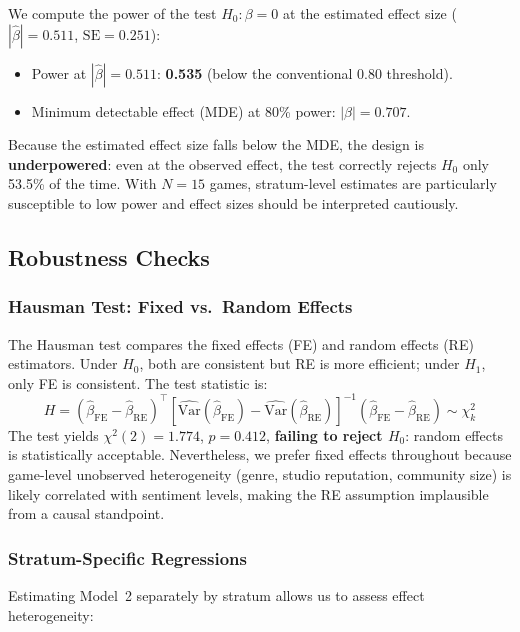 \documentclass[11pt, letterpaper]{article}
\begin{document}
We compute the power of the test $H_0: \beta = 0$ at the estimated effect size ($|\hat{\beta}| = 0.511$, $\text{SE} = 0.251$):
\begin{itemize}[nosep]
    \item Power at $|\hat{\beta}| = 0.511$: \textbf{0.535} (below the conventional 0.80 threshold).
    \item Minimum detectable effect (MDE) at 80\% power: $|\beta| = 0.707$.
\end{itemize}
Because the estimated effect size falls below the MDE, the design is \textbf{underpowered}: even at the observed effect, the test correctly rejects $H_0$ only 53.5\% of the time.
With $N = 15$ games, stratum-level estimates are particularly susceptible to low power and effect sizes should be interpreted cautiously.

\subsection{Robustness Checks}\label{sec:robustness}

\subsubsection{Hausman Test: Fixed vs.\ Random Effects}

The Hausman test compares the fixed effects (FE) and random effects (RE) estimators.
Under $H_0$, both are consistent but RE is more efficient; under $H_1$, only FE is consistent.
The test statistic is:
\[
    H = (\hat{\beta}_{\text{FE}} - \hat{\beta}_{\text{RE}})^\top [\widehat{\text{Var}}(\hat{\beta}_{\text{FE}}) - \widehat{\text{Var}}(\hat{\beta}_{\text{RE}})]^{-1} (\hat{\beta}_{\text{FE}} - \hat{\beta}_{\text{RE}}) \sim \chi^2_k
\]
The test yields $\chi^2(2) = 1.774$, $p = 0.412$, \textbf{failing to reject $H_0$}: random effects is statistically acceptable.
Nevertheless, we prefer fixed effects throughout because game-level unobserved heterogeneity (genre, studio reputation, community size) is likely correlated with sentiment levels, making the RE assumption implausible from a causal standpoint.

\subsubsection{Stratum-Specific Regressions}

Estimating Model~2 separately by stratum allows us to assess effect heterogeneity:
\end{document}
